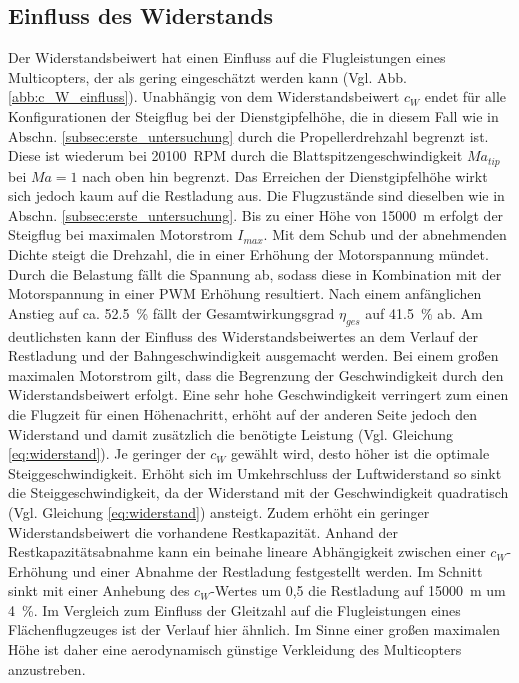 \subsection{Einfluss des Widerstands}
\label{subsec:widerstandseinfluss}
Der Widerstandsbeiwert hat einen Einfluss auf die Flugleistungen eines Multicopters, der als gering eingeschätzt werden kann (Vgl. Abb. \ref{abb:c_W_einfluss}). Unabhängig von dem Widerstandsbeiwert \ensuremath{c_W} endet für alle Konfigurationen der Steigflug bei der Dienstgipfelhöhe, die in diesem Fall wie in Abschn. \ref{subsec:erste_untersuchung} durch die Propellerdrehzahl begrenzt ist. Diese ist wiederum bei \SI{20100}{RPM} durch die Blattspitzengeschwindigkeit \ensuremath{Ma_{tip}} bei \ensuremath{Ma = 1} nach oben hin begrenzt. Das Erreichen der Dienstgipfelhöhe wirkt sich jedoch kaum auf die Restladung aus.
Die Flugzustände sind dieselben wie in Abschn. \ref{subsec:erste_untersuchung}. Bis zu einer Höhe von \SI{15000}{m} erfolgt der Steigflug bei maximalen Motorstrom \ensuremath{I_{max}}. Mit dem Schub und der abnehmenden Dichte steigt die Drehzahl, die in einer Erhöhung der Motorspannung mündet. Durch die Belastung fällt die Spannung ab, sodass diese in Kombination mit der Motorspannung in einer PWM Erhöhung resultiert. Nach einem anfänglichen Anstieg auf ca. \SI{52,5}{\%} fällt der Gesamtwirkungsgrad \ensuremath{\eta_{ges}} auf \SI{41,5}{\%} ab. 
Am deutlichsten kann der Einfluss des Widerstandsbeiwertes an dem Verlauf der Restladung und der Bahngeschwindigkeit ausgemacht werden. 
Bei einem großen maximalen Motorstrom gilt, dass die Begrenzung der Geschwindigkeit durch den Widerstandsbeiwert erfolgt. Eine sehr hohe Geschwindigkeit verringert zum einen die Flugzeit für einen Höhenachritt, erhöht auf der anderen Seite jedoch den Widerstand und damit zusätzlich die benötigte Leistung (Vgl. Gleichung \ref{eq:widerstand}). Je geringer der \ensuremath{c_W} gewählt wird, desto höher ist die optimale Steiggeschwindigkeit. Erhöht sich im Umkehrschluss der Luftwiderstand so sinkt die Steiggeschwindigkeit, da der Widerstand mit der Geschwindigkeit quadratisch (Vgl. Gleichung \ref{eq:widerstand}) ansteigt. Zudem erhöht ein geringer Widerstandsbeiwert die vorhandene Restkapazität. Anhand der Restkapazitätsabnahme kann ein beinahe lineare Abhängigkeit zwischen einer \ensuremath{c_W}-Erhöhung und einer Abnahme der Restladung festgestellt werden. Im Schnitt sinkt mit einer Anhebung des \ensuremath{c_W}-Wertes um 0,5 die Restladung auf \SI{15000}{m} um \SI{4}{\%}. Im Vergleich zum Einfluss der Gleitzahl auf die Flugleistungen eines Flächenflugzeuges ist der Verlauf hier ähnlich. 
Im Sinne einer großen maximalen Höhe ist daher eine aerodynamisch günstige Verkleidung des Multicopters anzustreben.
  

